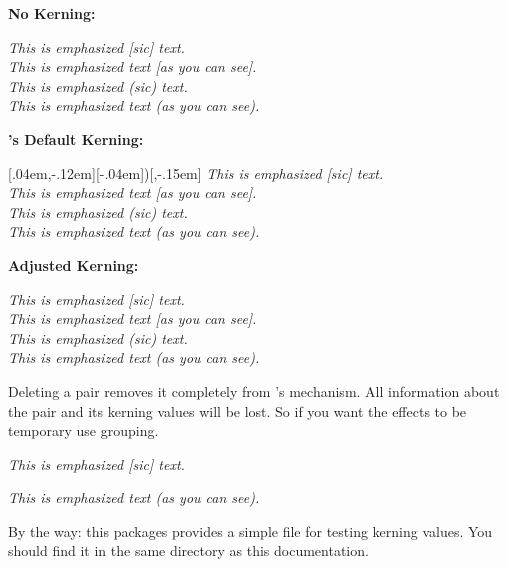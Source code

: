 \documentclass[load-preamble+]{cnltx-doc}
\begin{document}
\begin{center}
  \begin{minipage}{.5\linewidth}
    \textbf{No Kerning:}
  
    \RenewEmph{[}{]}\RenewEmph{(}{)}
    \emph{This is emphasized [sic] text.} \\
    \emph{This is emphasized text [as you can see].} \\
    \emph{This is emphasized (sic) text.} \\
    \emph{This is emphasized text (as you can see).}
  \end{minipage}\bigskip
 
  \begin{minipage}{.5\linewidth}
    \textbf{\embrac's Default Kerning:}
  
    \RenewEmph{[}{]}[.04em,-.12em]\RenewEmph{(}[-.04em]{)}[,-.15em]
    \emph{This is emphasized [sic] text.} \\
    \emph{This is emphasized text [as you can see].} \\
    \emph{This is emphasized (sic) text.} \\
    \emph{This is emphasized text (as you can see).}
  \end{minipage}\bigskip
 
  \begin{minipage}{.5\linewidth}
    \textbf{Adjusted Kerning:}
  
    \emph{This is emphasized [sic] text.} \\
    \emph{This is emphasized text [as you can see].} \\
    \emph{This is emphasized (sic) text.} \\
    \emph{This is emphasized text (as you can see).}
  \end{minipage}
\end{center}

Deleting a pair removes it completely from \embrac's mechanism.  All
information about the pair and its kerning values will be lost.  So if you
want the effects to be temporary use grouping.
\begin{example}
  \DeleteEmph{[}{]}
  \emph{This is emphasized [sic] text.} \par
  \emph{This is emphasized text (as you can see).}
\end{example}

By the way: this packages provides a simple file
 for testing kerning values.  You should find
it in the same directory as this documentation.
\end{document}
